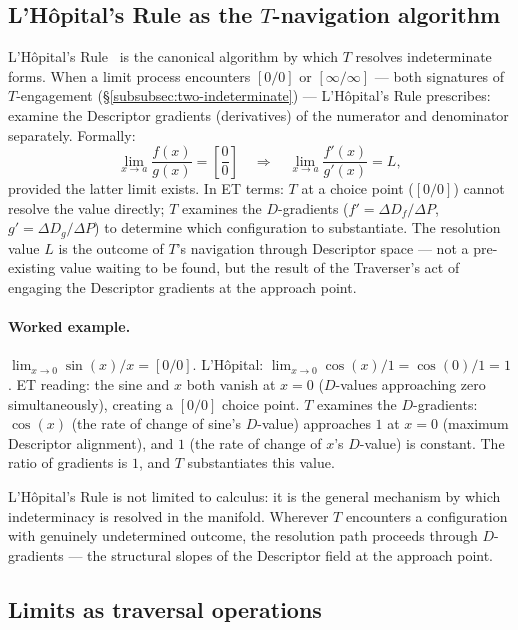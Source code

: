 \documentclass[11pt,a4paper]{article}
\theoremstyle{definition}
\theoremstyle{remark}
\begin{document}
\subsection{L'H\^opital's Rule as the $T$-navigation algorithm}\label{subsec:lhopital}

L'H\^opital's Rule~\cite{LHopital1696} is the canonical algorithm by which $T$ resolves indeterminate forms. When a limit process encounters $[0/0]$ or $[\infty/\infty]$ --- both signatures of $T$-engagement (\S\ref{subsubsec:two-indeterminate}) --- L'H\^opital's Rule prescribes: examine the Descriptor gradients (derivatives) of the numerator and denominator separately. Formally:
\[
\lim_{x \to a} \frac{f(x)}{g(x)} = \left[\frac{0}{0}\right] \quad\Longrightarrow\quad \lim_{x \to a} \frac{f'(x)}{g'(x)} = L,
\]
provided the latter limit exists. In ET terms: $T$ at a choice point ($[0/0]$) cannot resolve the value directly; $T$ examines the $D$-gradients ($f' = \Delta D_{f}/\Delta P$, $g' = \Delta D_{g}/\Delta P$) to determine which configuration to substantiate. The resolution value $L$ is the outcome of $T$'s navigation through Descriptor space --- not a pre-existing value waiting to be found, but the result of the Traverser's act of engaging the Descriptor gradients at the approach point.

\paragraph{Worked example.} $\lim_{x \to 0} \sin(x)/x = [0/0]$. L'H\^opital: $\lim_{x \to 0} \cos(x)/1 = \cos(0)/1 = 1$. ET reading: the sine and $x$ both vanish at $x = 0$ ($D$-values approaching zero simultaneously), creating a $[0/0]$ choice point. $T$ examines the $D$-gradients: $\cos(x)$ (the rate of change of sine's $D$-value) approaches $1$ at $x = 0$ (maximum Descriptor alignment), and $1$ (the rate of change of $x$'s $D$-value) is constant. The ratio of gradients is $1$, and $T$ substantiates this value.

L'H\^opital's Rule is not limited to calculus: it is the general mechanism by which indeterminacy is resolved in the manifold. Wherever $T$ encounters a configuration with genuinely undetermined outcome, the resolution path proceeds through $D$-gradients --- the structural slopes of the Descriptor field at the approach point.

\subsection{Limits as traversal operations}\label{subsec:limits-traversal}
\end{document}

